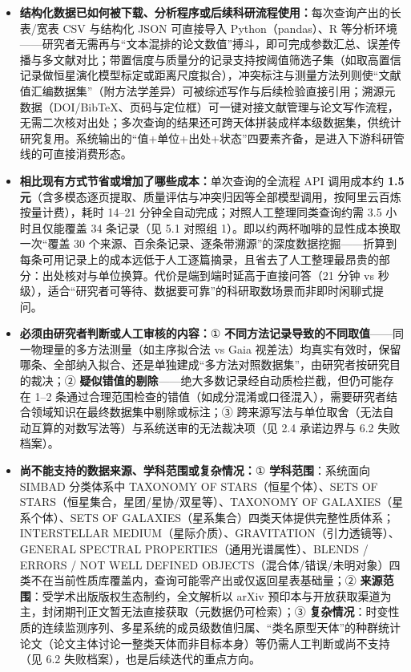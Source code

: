 \begin{itemize}[leftmargin=1.2em,itemsep=3pt]
\item \textbf{结构化数据已如何被下载、分析程序或后续科研流程使用：}每次查询产出的长表/宽表 CSV 与结构化 JSON 可直接导入 Python（pandas）、R 等分析环境——研究者无需再与“文本混排的论文数值”搏斗，即可完成参数汇总、误差传播与多文献对比；带置信度与质量分的记录支持按阈值筛选子集（如取高置信记录做恒星演化模型标定或距离尺度拟合），冲突标注与测量方法列则使“文献值汇编数据集”（附方法学差异）可被综述写作与后续检验直接引用；溯源元数据（DOI/BibTeX、页码与定位框）可一键对接文献管理与论文写作流程，无需二次核对出处；多次查询的结果还可跨天体拼装成样本级数据集，供统计研究复用。系统输出的“值+单位+出处+状态”四要素齐备，是进入下游科研管线的可直接消费形态。
\item \textbf{相比现有方式节省或增加了哪些成本：}单次查询的全流程 API 调用成本约 \textbf{1.5 元}（含多模态逐页提取、质量评估与冲突归因等全部模型调用，按阿里云百炼按量计费），耗时 14--21 分钟全自动完成；对照人工整理同类查询约需 3.5 小时且仅能覆盖 34 条记录（见 5.1 对照组 1）。即以约两杯咖啡的显性成本换取一次“覆盖 30 个来源、百余条记录、逐条带溯源”的深度数据挖掘——折算到每条可用记录上的成本远低于人工逐篇摘录，且省去了人工整理最昂贵的部分：出处核对与单位换算。代价是端到端时延高于直接问答（21 分钟 vs 秒级），适合“研究者可等待、数据要可靠”的科研取数场景而非即时闲聊式提问。
\item \textbf{必须由研究者判断或人工审核的内容：}① \textbf{不同方法记录导致的不同取值}——同一物理量的多方法测量（如主序拟合法 vs Gaia 视差法）均真实有效时，保留哪条、全部纳入拟合、还是单独建成“多方法对照数据集”，由研究者按研究目的裁决；② \textbf{疑似错值的剔除}——绝大多数记录经自动质检拦截，但仍可能存在 1--2 条通过合理范围检查的错值（如成分混淆或口径混入），需要研究者结合领域知识在最终数据集中剔除或标注；③ 跨来源写法与单位取舍（无法自动互算的对数写法等）与系统送审的无法裁决项（见 2.4 承诺边界与 6.2 失败档案）。
\item \textbf{尚不能支持的数据来源、学科范围或复杂情况：}① \textbf{学科范围}：系统面向 SIMBAD 分类体系中 TAXONOMY OF STARS（恒星个体）、SETS OF STARS（恒星集合，星团/星协/双星等）、TAXONOMY OF GALAXIES（星系个体）、SETS OF GALAXIES（星系集合）四类天体提供完整性质体系；INTERSTELLAR MEDIUM（星际介质）、GRAVITATION（引力透镜等）、GENERAL SPECTRAL PROPERTIES（通用光谱属性）、BLENDS / ERRORS / NOT WELL DEFINED OBJECTS（混合体/错误/未明对象）四类不在当前性质库覆盖内，查询可能零产出或仅返回星表基础量；② \textbf{来源范围}：受学术出版版权生态制约，全文解析以 arXiv 预印本与开放获取渠道为主，封闭期刊正文暂无法直接获取（元数据仍可检索）；③ \textbf{复杂情况}：时变性质的连续监测序列、多星系统的成员级数值归属、“类名原型天体”的种群统计论文（论文主体讨论一整类天体而非目标本身）等仍需人工判断或尚不支持（见 6.2 失败档案），也是后续迭代的重点方向。
\end{itemize}

